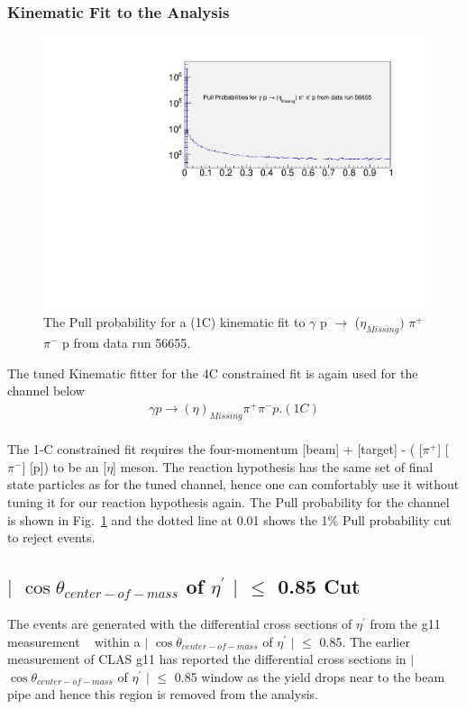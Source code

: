 \subsubsection{Kinematic Fit to the Analysis}
	
\begin{figure}[ht!]
\centerline{
\includegraphics[width=12cm,height=8cm]{Prob_etafit.pdf}}
\caption{The Pull probability for a (1C) kinematic fit to $\gamma$ p $\rightarrow$ ($\eta_{Missing})$ $\pi^{+}$ $\pi^{-}$ p from data run 56655.}
\label{Fig5}
\end{figure} 

The tuned Kinematic fitter for the 4C constrained fit is again used for the channel below
\begin{eqnarray*}
\gamma p \rightarrow (\eta)_{Missing} \pi^{+} \pi^{-} p. (1C)
\end{eqnarray*}\\	
 The 1-C constrained fit requires the four-momentum [beam] + [target] - ( [$\pi^{+}$] [$\pi^{-}$] [p]) to be an [$\eta$] meson. The reaction hypothesis has the same set of final state particles as for the tuned channel, hence one can comfortably use it without tuning it for our reaction hypothesis again. The Pull probability for the channel is shown in Fig.~\ref{Fig5} and the dotted line at 0.01 shows the 1$\%$ Pull probability cut to reject events. 

\subsection{$\mid$ $\cos\theta_{center-of-mass}$ of $\eta^{\prime}$ $\mid$ $\leq$ 0.85 Cut}
\label{Cos}


The events are generated with the differential cross sections of $\eta^{\prime}$ from the g11 measurement ~\cite{Williams:2009yj} within a $\mid$ $\cos\theta_{center-of-mass}$ of $\eta^{\prime}$ $\mid$ $\leq$ 0.85. The earlier measurement of CLAS g11 has reported the differential cross sections in $\mid$ $\cos\theta_{center-of-mass}$ of $\eta^{\prime}$ $\mid$ $\leq$ 0.85 window as the yield drops near to the beam pipe and hence this region is removed from the analysis.  

